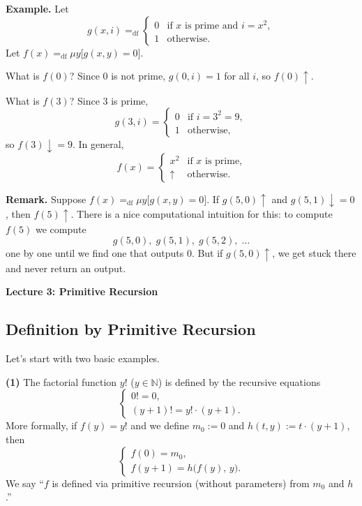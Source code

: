 \documentclass[11pt]{article}
\begin{document}
\textbf{Example.} Let
\[
    g(x, i) =_{\mathrm{df}} \begin{cases} 0 & \text{if } x \text{ is prime and } i = x^2, \\ 1 & \text{otherwise.} \end{cases}
\]
Let $f(x) =_{\mathrm{df}} \mu y\bigl[g(x, y) = 0\bigr]$.

What is $f(0)$? Since $0$ is not prime, $g(0, i) = 1$ for all $i$, so $f(0){\uparrow}$.

What is $f(3)$? Since $3$ is prime,
\[
    g(3, i) = \begin{cases} 0 & \text{if } i = 3^2 = 9, \\ 1 & \text{otherwise,} \end{cases}
\]
so $f(3){\downarrow}= 9$. In general,
\[
    f(x) = \begin{cases} x^2 & \text{if } x \text{ is prime,} \\ {\uparrow} & \text{otherwise.} \end{cases}
\]

\textbf{Remark.} Suppose $f(x) =_{\mathrm{df}} \mu y\bigl[g(x, y) = 0\bigr]$. If $g(5,0){\uparrow}$ and $g(5,1){\downarrow}= 0$, then $f(5){\uparrow}$. There is a nice computational intuition for this: to compute $f(5)$ we compute
\[
    g(5,0),\; g(5,1),\; g(5,2),\; \dots
\]
one by one until we find one that outputs $0$. But if $g(5,0){\uparrow}$, we get stuck there and never return an output.

\newpage

{\LARGE\bfseries Lecture 3: Primitive Recursion}

\subsection{Definition by Primitive Recursion}

Let's start with two basic examples.

\textbf{(1)} The factorial function $y!$ ($y \in \mathbb{N}$) is defined by the recursive equations
\[
    \begin{cases} 0! = 0, \\ (y+1)! = y! \cdot (y+1). \end{cases}
\]
More formally, if $f(y) = y!$ and we define $m_0 := 0$ and $h(t, y) := t \cdot (y+1)$, then
\[
    \begin{cases} f(0) = m_0, \\ f(y+1) = h\bigl(f(y),\, y\bigr). \end{cases}
\]
We say ``$f$ is defined via primitive recursion (without parameters) from $m_0$ and $h$.''
\end{document}
